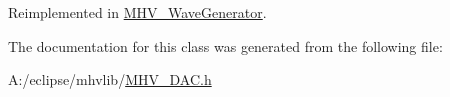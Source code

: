 Reimplemented in \hyperlink{class_m_h_v___wave_generator_a57d400e9427c7cfb38c6700c202998e5}{M\-H\-V\-\_\-\-Wave\-Generator}.



The documentation for this class was generated from the following file\-:\begin{DoxyCompactItemize}
\item 
A\-:/eclipse/mhvlib/\hyperlink{_m_h_v___d_a_c_8h}{M\-H\-V\-\_\-\-D\-A\-C.\-h}\end{DoxyCompactItemize}

